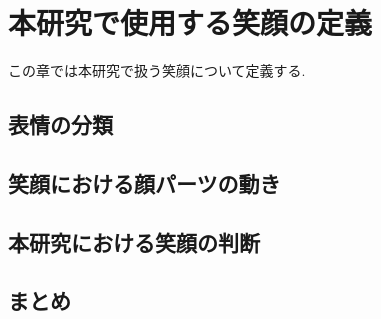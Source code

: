 \chapter{本研究で使用する笑顔の定義}
\label{chap:smile}

この章では本研究で扱う笑顔について定義する.

\section{表情の分類}

\section{笑顔における顔パーツの動き}

\section{本研究における笑顔の判断}

\section{まとめ}
